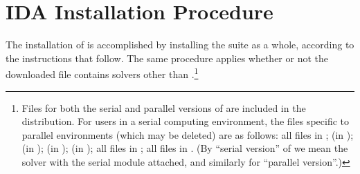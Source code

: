 \chapter{IDA Installation Procedure}\label{c:install}

The installation of {\ida} is accomplished by installing the
{\sundials} suite as a whole, according to the instructions that
follow.   The same procedure applies whether or not the downloaded
file contains solvers other than {\ida}.\footnote{Files for both the
serial and parallel versions of {\ida} are included in the distribution.
For users in a serial computing environment, the files specific to parallel
environments (which may be deleted) are as follows:
all files in ;
 (in );
 (in );
 (in ); 
 (in );
all files in ;
all files in .
(By ``serial version'' of {\ida} we mean the {\ida} solver with the
serial {\nvector} module attached, and similarly for ``parallel version''.)}

